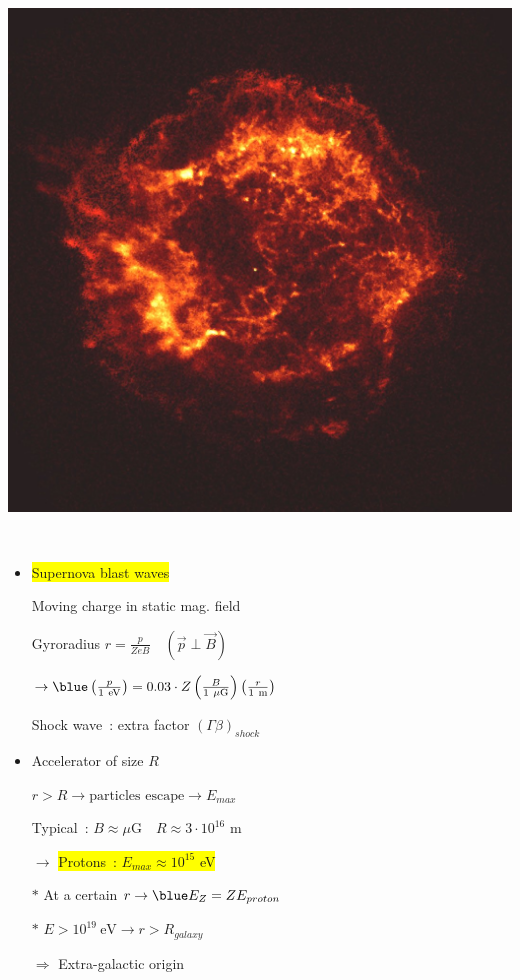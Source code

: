 \Tr
\begin{center}
\includegraphics[keepaspectratio,height=15cm]{Cas_A}
\end{center}

\Tr
{}%
\begin{itemize}
\item \colorbox{yellow}{Supernova blast waves}
\item[] Moving charge in static mag. field
\item[] Gyroradius $r=\frac{p}{ZeB} \quad (\vec{p} \perp \vec{B})$
\item[] $\rightarrow
         {\blue \left(\frac{p}{1~\rm{eV}}\right)=0.03 \cdot Z \left(\frac{B}{1~\mu\rm{G}}\right)
         \left(\frac{r}{1~\rm{m}}\right)}$
\item[] Shock wave~: extra factor $(\Gamma\beta)_{shock}$
\item Accelerator of size $R$
\item[] $r > R \rightarrow \text{particles~escape} \rightarrow E_{max}$
\item[] Typical~: $B \approx \mu\text{G} \quad R \approx 3 \cdot 10^{16}$ m
\item[] $\rightarrow$ \colorbox{yellow}{Protons~: $E_{max} \approx 10^{15}$ eV}
\item[$\ast$] At a certain $r \rightarrow {\blue E_{Z}=Z E_{proton}}$
\item[$\ast$] $E>10^{19}~\text{eV} \rightarrow r>R_{galaxy}$
\item[] $\Rightarrow$ Extra-galactic origin
\end{itemize}

